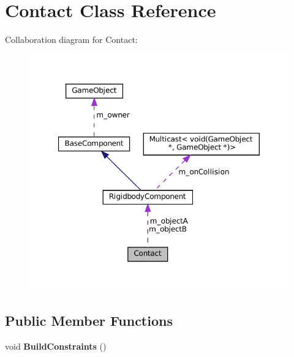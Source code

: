 \hypertarget{classContact}{}\section{Contact Class Reference}
\label{classContact}


Collaboration diagram for Contact\+:\nopagebreak
\begin{figure}[H]
\begin{center}
\leavevmode
\includegraphics[width=350pt]{classContact__coll__graph}
\end{center}
\end{figure}
\subsection*{Public Member Functions}
\begin{DoxyCompactItemize}
\item 
\mbox{\label{classContact_a1af30adc27b3cc1b971dcfe01959f9e9}} 
void {\bfseries Build\+Constraints} ()
\end{DoxyCompactItemize}
